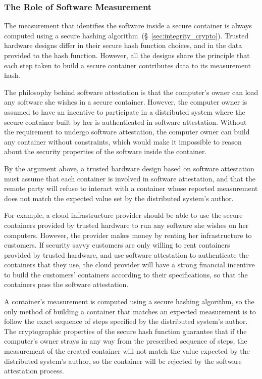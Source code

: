 \subsubsection{The Role of Software Measurement}
\label{sec:generic_measurement}

The measurement that identifies the software inside a secure container is
always computed using a secure hashing
algorithm~(\S~\ref{sec:integrity_crypto}). Trusted hardware designs differ in
their secure hash function choices, and in the data provided to the hash
function. However, all the designs share the principle that each step taken to
build a secure container contributes data to its measurement hash.

The philosophy behind software attestation is that the computer's owner can
load any software she wishes in a secure container. However, the computer owner
is assumed to have an incentive to participate in a distributed system where
the secure container built by her is authenticated in software attestation.
Without the requirement to undergo software attestation, the computer owner can
build any container without constraints, which would make it impossible to
reason about the security properties of the software inside the container.

By the argument above, a trusted hardware design based on software attestation
must assume that each container is involved in software attestation, and that
the remote party will refuse to interact with a container whose reported
measurement does not match the expected value set by the distributed system's
author.

For example, a cloud infrastructure provider should be able to use the secure
containers provided by trusted hardware to run any software she wishes on her
computers. However, the provider makes money by renting her infrastructure to
customers. If security savvy customers are only willing to rent containers
provided by trusted hardware, and use software attestation to authenticate the
containers that they use, the cloud provider will have a strong financial
incentive to build the customers' containers according to their specifications,
so that the containers pass the software attestation.

A container's measurement is computed using a secure hashing algorithm, so the
only method of building a container that matches an expected measurement is to
follow the exact sequence of steps specified by the distributed system's
author. The cryptographic properties of the secure hash function guarantee that
if the computer's owner strays in any way from the prescribed sequence of
steps, the measurement of the created container will not match the value
expected by the distributed system's author, so the container will be rejected
by the software attestation process.


